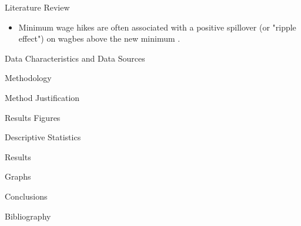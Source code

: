 \documentclass[12pt]{beamer}
\begin{document}
\begin{frame}[allowframebreaks]{Literature Review}
	\begin{itemize}
		\item Minimum wage hikes are often associated with a positive spillover (or "ripple effect") on wagbes above the new minimum \cite{cengiz2019effect}.
	\end{itemize}

\end{frame}

\begin{frame}[allowframebreaks]{Data Characteristics and Data Sources}

\end{frame}

\begin{frame}[allowframebreaks]{Methodology}

\end{frame}

\begin{frame}[allowframebreaks]{Method Justification}

\end{frame}

\begin{frame}[allowframebreaks]{Results Figures}

\end{frame}

\begin{frame}[allowframebreaks]{Descriptive Statistics}

\end{frame}

\begin{frame}[allowframebreaks]{Results}

\end{frame}

\begin{frame}[allowframebreaks]{Graphs}

\end{frame}

\begin{frame}[allowframebreaks]{Conclusions}
	\cite{ashenfelter2022minimum}

\end{frame}
\begin{frame}[allowframebreaks]{Bibliography}
	\printbibliography
\end{frame}
\end{document}
